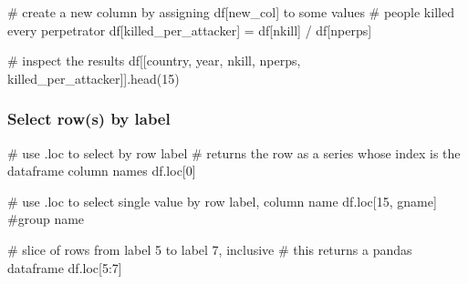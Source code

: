 \documentclass[
  letterpaper,
  DIV=11,
  numbers=noendperiod]{scrreprt}
\newenvironment{Shaded}{\begin{snugshade}}{\end{snugshade}}
\newcommand{\CommentTok}[1]{\textcolor[rgb]{0.37,0.37,0.37}{#1}}
\newcommand{\DecValTok}[1]{\textcolor[rgb]{0.68,0.00,0.00}{#1}}
\newcommand{\NormalTok}[1]{\textcolor[rgb]{0.00,0.23,0.31}{#1}}
\newcommand{\OperatorTok}[1]{\textcolor[rgb]{0.37,0.37,0.37}{#1}}
\newcommand{\StringTok}[1]{\textcolor[rgb]{0.13,0.47,0.30}{#1}}
\begin{document}
\begin{Shaded}
\begin{Highlighting}[]
\CommentTok{\# create a new column by assigning df[\textquotesingle{}new\_col\textquotesingle{}] to some values}
\CommentTok{\# people killed every perpetrator }
\NormalTok{df[}\StringTok{\textquotesingle{}killed\_per\_attacker\textquotesingle{}}\NormalTok{] }\OperatorTok{=}\NormalTok{ df[}\StringTok{\textquotesingle{}nkill\textquotesingle{}}\NormalTok{] }\OperatorTok{/}\NormalTok{ df[}\StringTok{\textquotesingle{}nperps\textquotesingle{}}\NormalTok{]}

\CommentTok{\# inspect the results}
\NormalTok{df[[}\StringTok{\textquotesingle{}country\textquotesingle{}}\NormalTok{, }\StringTok{\textquotesingle{}year\textquotesingle{}}\NormalTok{, }\StringTok{\textquotesingle{}nkill\textquotesingle{}}\NormalTok{, }\StringTok{\textquotesingle{}nperps\textquotesingle{}}\NormalTok{, }\StringTok{\textquotesingle{}killed\_per\_attacker\textquotesingle{}}\NormalTok{]].head(}\DecValTok{15}\NormalTok{)}
\end{Highlighting}
\end{Shaded}

\subsubsection{Select row(s) by label}\label{select-rows-by-label}

\begin{Shaded}
\begin{Highlighting}[]
\CommentTok{\# use .loc to select by row label}
\CommentTok{\# returns the row as a series whose index is the dataframe column names}
\NormalTok{df.loc[}\DecValTok{0}\NormalTok{]}
\end{Highlighting}
\end{Shaded}

\begin{Shaded}
\begin{Highlighting}[]
\CommentTok{\# use .loc to select single value by row label, column name}
\NormalTok{df.loc[}\DecValTok{15}\NormalTok{, }\StringTok{\textquotesingle{}gname\textquotesingle{}}\NormalTok{] }\CommentTok{\#group name}
\end{Highlighting}
\end{Shaded}

\begin{Shaded}
\begin{Highlighting}[]
\CommentTok{\# slice of rows from label 5 to label 7, inclusive}
\CommentTok{\# this returns a pandas dataframe}
\NormalTok{df.loc[}\DecValTok{5}\NormalTok{:}\DecValTok{7}\NormalTok{]}
\end{Highlighting}
\end{Shaded}
\end{document}
